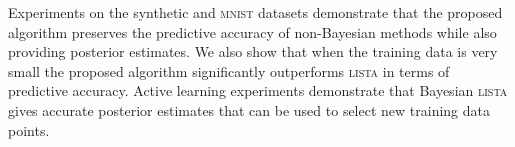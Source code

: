\documentclass{article}
\begin{document}
Experiments on the synthetic and \textsc{mnist} datasets demonstrate that the proposed algorithm preserves the predictive accuracy of non-Bayesian methods while also providing posterior estimates. We also show that when the training data is very small the proposed algorithm significantly outperforms \textsc{lista} in terms of predictive accuracy. Active learning experiments demonstrate that Bayesian \textsc{lista} gives accurate posterior estimates that can be used to select new training data points.


\small


\end{document}
